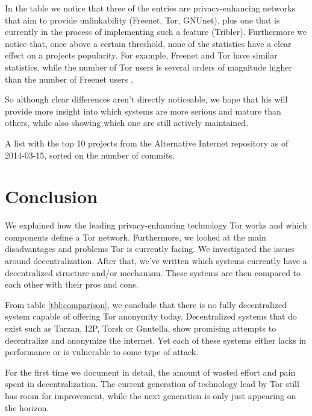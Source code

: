 \documentclass{article}
\begin{document}
		In the table we notice that three of the entries are privacy-enhancing networks that aim to provide unlinkability (Freenet, Tor, GNUnet), plus one that is currently in the process of implementing such a feature (Tribler). Furthermore we notice that, once above a certain threshold, none of the statistics have a clear effect on a projects popularity. For example, Freenet and Tor have similar statistics, while the number of Tor users \cite{tormetricsprojectwebsite} is several orders of magnitude higher than the number of Freenet users \cite{freenetstatistics}.
		
		So although clear differences aren't directly noticeable, we hope that his will provide more insight into which systems are more serious and mature than others, while also showing which one are still actively maintained.
		
	\begin{table}
		\centering
		
		\caption{A list with the top 10 projects from the Alternative Internet repository as of 2014-03-15, sorted on the number of commits.}
		\label{tbl:altinternet}
	\end{table}
	
	\newpage
		

\section{Conclusion}
	\label{sec:conclusion}
		
	We explained how the leading privacy-enhancing technology Tor works and which components define a Tor network. Furthermore, we looked at the main disadvantages and problems Tor is currently facing. We investigated the issues around decentralization. After that, we've written which systems currently have a decentralized structure and/or mechanism. These systems are then compared to each other with their pros and cons.
		
	From table \ref{tbl:comparison}, we conclude that there is no fully decentralized system capable of offering Tor anonymity today. Decentralized systems that do exist such as Tarzan, I2P, Torsk or Gnutella, show promising attempts to decentralize and anonymize the internet. Yet each of these systems either lacks in performance or is vulnerable to some type of attack.
		
	For the first time we document in detail, the amount of wasted effort and pain spent in decentralization. The current generation of technology lead by Tor still has room for improvement, while the next generation is only just appearing on the horizon.



\end{document}
